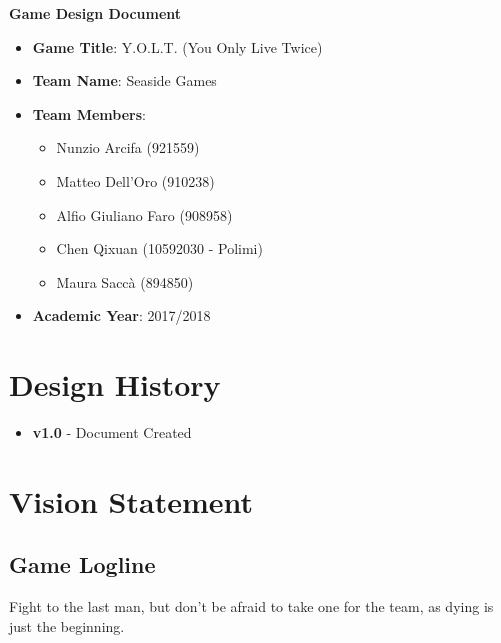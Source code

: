\documentclass[12pt]{article}
\begin{document}
\begin{center}
	\vspace*{1cm}
	
	\textbf{Game Design Document}
	
	\vspace*{4cm}
	\begin{itemize}
		\item \textbf{Game Title}: Y.O.L.T. (You Only Live Twice)
		\item \textbf{Team Name}: Seaside Games
		\item \textbf{Team Members}:
		\begin{itemize}
			\item Nunzio Arcifa (921559)
			\item Matteo Dell'Oro (910238)
			\item Alfio Giuliano Faro (908958)
			\item Chen Qixuan (10592030 - Polimi)
			\item Maura Saccà (894850)
		\end{itemize}
		\item \textbf{Academic Year}: 2017/2018
	\end{itemize}
	
\end{center}

\newpage

\tableofcontents

\newpage

\section{Design History}

\begin{itemize}
	\item \textbf{v1.0} - Document Created
\end{itemize}

\newpage

\section{Vision Statement}

\subsection{Game Logline}

Fight to the last man, but don't be afraid to take one for the team, as dying is just the beginning.
\end{document}
